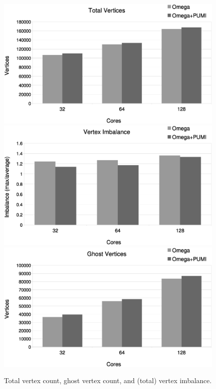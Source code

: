 \documentclass[a4paper]{article}
\begin{document}
\begin{figure}[ht]
\centering
  \includegraphics[width=\textwidth]{total-vtx.eps} \\
  \includegraphics[width=\textwidth]{vtx-imb.eps} \\
  \includegraphics[width=\textwidth]{ghost-vtx.eps}
  \caption{\label{fig:vtx} Total vertex count, ghost vertex count, and (total) vertex imbalance.}
\end{figure}
\end{document}

